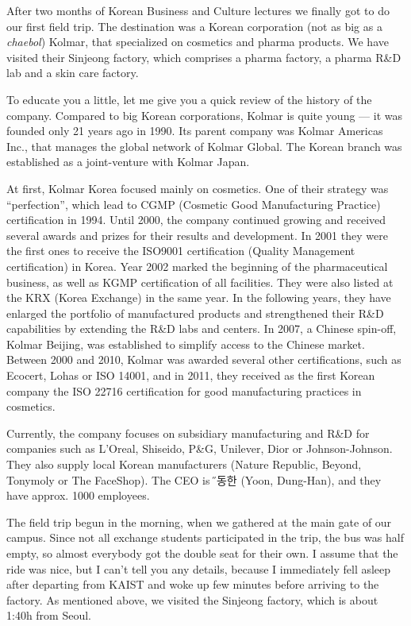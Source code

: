 \begin{post}
	\begin{content}
After two months of Korean Business and Culture lectures we finally got to do our first field trip. The destination was a Korean corporation (not as big as a \textit{chaebol}) Kolmar, that specialized on cosmetics and pharma products. We have visited their Sinjeong factory, which comprises a pharma factory, a pharma R\&D lab and a skin care factory.

To educate you a little, let me give you a quick review of the history of the company. Compared to big Korean corporations, Kolmar is quite young — it was founded only 21 years ago in 1990. Its parent company was Kolmar Americas Inc., that manages the global network of Kolmar Global. The Korean branch was established as a joint-venture with Kolmar Japan.

At first, Kolmar Korea focused mainly on cosmetics. One of their strategy was ``perfection'', which lead to CGMP (Cosmetic Good Manufacturing Practice) certification in 1994. Until 2000, the company continued growing and received several awards and prizes for their results and development. In 2001 they were the first ones to receive the ISO9001 certification (Quality Management certification) in Korea. Year 2002 marked the beginning of the pharmaceutical business, as well as KGMP certification of all facilities. They were also listed at the KRX (Korea Exchange) in the same year. In the following years, they have enlarged the portfolio of manufactured products and strengthened their R\&D capabilities by extending the R\&D labs and centers. In 2007, a Chinese spin-off, Kolmar Beijing, was established to simplify access to the Chinese market. Between 2000 and 2010, Kolmar was awarded several other certifications, such as Ecocert, Lohas or ISO 14001, and in 2011, they received as the first Korean company the ISO 22716 certification for good manufacturing practices in cosmetics.

Currently, the company focuses on subsidiary manufacturing and R\&D for companies such as L'Oreal, Shiseido, P\&G, Unilever, Dior or Johnson-Johnson. They also supply local Korean manufacturers (Nature Republic, Beyond, Tonymoly or The FaceShop). The CEO is {\H 윤동한} (Yoon, Dung-Han), and they have approx. 1000 employees.

The field trip begun in the morning, when we gathered at the main gate of our campus. Since not all exchange students participated in the trip, the bus was half empty, so almost everybody got the double seat for their own. I assume that the ride was nice, but I can't tell you any details, because I immediately fell asleep after departing from KAIST and woke up few minutes before arriving to the factory. As mentioned above, we visited the Sinjeong factory, which is about 1:40h from Seoul.


\end{content}
\end{post}

